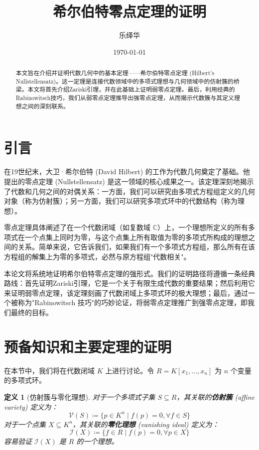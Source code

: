 \documentclass[UTF8]{ctexart}
\title{希尔伯特零点定理的证明}
\author{乐绎华}
\date{\today}
\newtheorem{definition}[theorem]{定义}
\newcommand{\V}{\mathcal{V}}
\newcommand{\I}{\mathcal{I}}
\begin{document}
\maketitle

\begin{abstract}
本文旨在介绍并证明代数几何中的基本定理——希尔伯特零点定理 (Hilbert's Nullstellensatz)。这一定理是连接代数领域中的多项式理想与几何领域中的仿射簇的桥梁。本文将首先介绍Zariski引理，并在此基础上证明弱零点定理。最后，利用经典的Rabinowitsch技巧，我们从弱零点定理推导出强零点定理，从而揭示代数簇与其定义理想之间的深刻联系。
\end{abstract}

\section{引言}

在19世纪末，大卫·希尔伯特 (David Hilbert) 的工作为代数几何奠定了基础。他提出的零点定理 (Nullstellensatz) 是这一领域的核心成果之一。该定理深刻地揭示了代数和几何之间的对偶关系：一方面，我们可以研究由多项式方程组定义的几何对象（称为仿射簇）；另一方面，我们可以研究多项式环中的代数结构（称为理想）。

零点定理具体阐述了在一个代数闭域（如复数域 $\mathbb{C}$）上，一个理想所定义的所有多项式在一个点集上同时为零，与这个点集上所有取值为零的多项式所构成的理想之间的关系。简单来说，它告诉我们，如果我们有一个多项式方程组，那么所有在该方程组的解集上为零的多项式，必然与原方程组"代数相关"。

本论文将系统地证明希尔伯特零点定理的强形式。我们的证明路径将遵循一条经典路线：首先证明Zariski引理，它是一个关于有限生成代数的重要结果；然后利用它来证明弱零点定理，该定理刻画了代数闭域上多项式环的极大理想；最后，通过一个被称为"Rabinowitsch 技巧"的巧妙论证，将弱零点定理推广到强零点定理，即我们最终的目标。

\section{预备知识和主要定理的证明}

在本节中，我们将在代数闭域 $K$ 上进行讨论。令 $R = K[x_1, \dots, x_n]$ 为 $n$ 个变量的多项式环。

\begin{definition}[仿射簇与零化理想]
对于一个多项式子集 $S \subseteq R$，其关联的\textbf{仿射簇} (affine variety) 定义为：
$$ \V(S) \coloneqq \{ p \in K^n \mid f(p) = 0, \forall f \in S \} $$
对于一个点集 $X \subseteq K^n$，其关联的\textbf{零化理想} (vanishing ideal) 定义为：
$$ \I(X) \coloneqq \{ f \in R \mid f(p) = 0, \forall p \in X \} $$
容易验证 $\I(X)$ 是 $R$ 的一个理想。
\end{definition}
\end{document}
